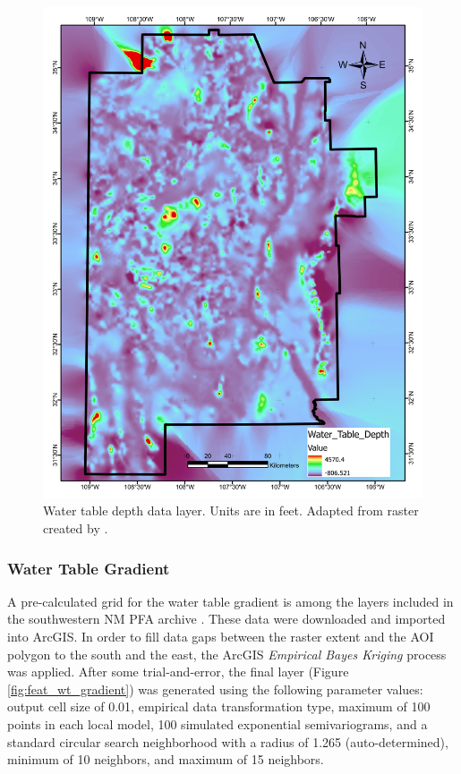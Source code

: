 \begin{figure}[!htp]
\centering
\includegraphics[scale=.50]{templates/images/Figure-WTDepth.pdf}
\caption[Water table depth data layer]{Water table depth data layer. Units are in feet. Adapted from raster created by \protect\citep{bielicki_hydrogeolgic_2015}.}
\label{fig:feat_wtdepth}
\end{figure}

\subsubsection{Water Table Gradient}

A pre-calculated grid for the water table gradient is among the layers included in the southwestern NM PFA archive \citep{kelley_geothermal_2015}. These data were downloaded and imported into ArcGIS. In order to fill data gaps between the raster extent and the AOI polygon to the south and the east, the ArcGIS \textit{Empirical Bayes Kriging} process was applied. After some trial-and-error, the final layer (Figure \ref{fig:feat_wt_gradient}) was generated using the following parameter values: output cell size of 0.01, empirical data transformation type, maximum of 100 points in each local model, 100 simulated exponential semivariograms, and a standard circular search neighborhood with a radius of 1.265 (auto-determined), minimum of 10 neighbors, and maximum of 15 neighbors.

